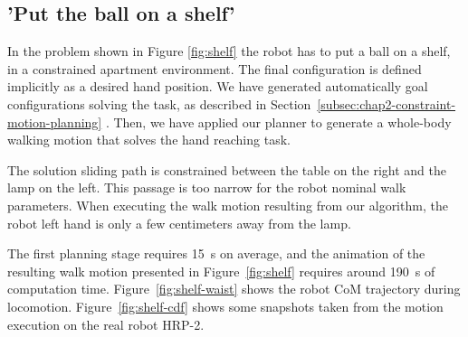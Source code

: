 \subsection{'Put the ball on a shelf'}
\label{sec:shelf}

In the problem shown in Figure \ref{fig:shelf} the robot has to put a
ball on a shelf, in a constrained apartment environment. The final
configuration is defined implicitly as a desired hand position. We
have generated automatically goal configurations solving the task, as
described in Section~\ref{subsec:chap2-constraint-motion-planning}
. Then, we have applied our planner to generate a whole-body walking
motion that solves the hand reaching task.

The solution sliding path is constrained between the table on the
right and the lamp on the left. This passage is too narrow for the
robot nominal walk parameters.  When executing the walk motion
resulting from our algorithm, the robot left hand is only a few
centimeters away from the lamp.

The first planning stage requires 15~s on average, and the animation
of the resulting walk motion presented in Figure~\ref{fig:shelf}
requires around 190~s of computation
time. Figure~\ref{fig:shelf-waist} shows the robot CoM trajectory
during locomotion. Figure~\ref{fig:shelf-cdf} shows some snapshots
taken from the motion execution on the real robot HRP-2.

